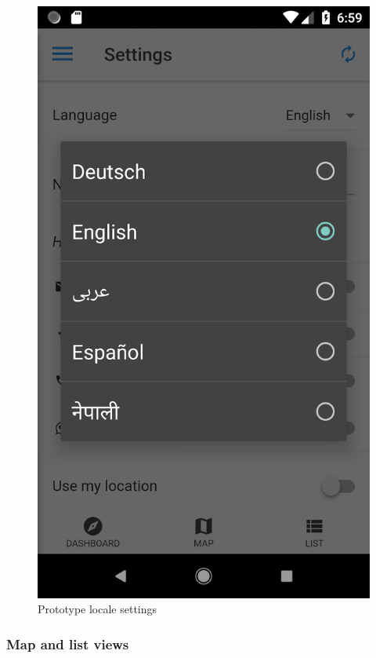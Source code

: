 \begin{figure}[ht]
  \centering
  \includegraphics[scale=0.25]{images/screenshots/screenshot_locales.png}
  \caption{Prototype locale settings}
  \label{fig:scr_locales}
\end{figure}

\subsubsection*{Map and list views}

